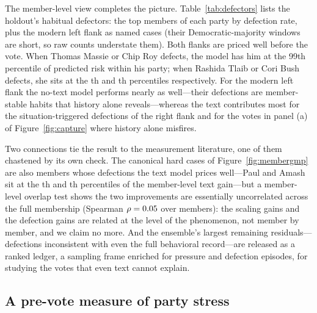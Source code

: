 \documentclass[12pt]{article}
\begin{document}
The member-level view completes the picture.
Table~\ref{tab:defectors} lists the holdout's habitual defectors: the
top members of each party by defection rate, plus the modern left
flank as named cases (their Democratic-majority windows are short, so
raw counts understate them). Both flanks are priced well before the
vote. When Thomas Massie or Chip Roy defects, the model has him at
the 99th percentile of predicted risk within his party; when Rashida
Tlaib or Cori Bush defects, she sits at the \tlaibPctChamp th and
\bushPctChamp th percentiles respectively. For the modern left flank
the no-text model performs nearly as well---their defections are
member-stable habits that history alone reveals---whereas the text
contributes most for the situation-triggered defections of the
right flank and for the votes in panel (a) of
Figure~\ref{fig:capture} where history alone misfires.

\begin{table}[!tbp]
\centering
\caption{The holdout's habitual majority defectors. ``Rate'' is
defections per majority-yea passage-family vote in the member's
holdout windows. The risk percentile is the member's mean percentile
of predicted defection probability within their party, computed
before each vote, on the votes where they in fact defected (100 =
ranked the likeliest defector in the party every time).}
\label{tab:defectors}
{\small }
\end{table}

Two connections tie the result to the measurement literature, one of
them chastened by its own check. The canonical hard cases of
Figure~\ref{fig:membergmp} are also members whose defections the
text model prices well---Paul and Amash sit at the
\paulDefGainPct th and \amashDefGainPct th percentiles of the
member-level text gain---but a member-level
overlap test shows the two improvements are essentially uncorrelated
across the full membership (Spearman $\rho = 0.05$ over
\overlapN{} members): the scaling gains and the defection gains are
related at the level of the phenomenon, not member by member, and we
claim no more. And the ensemble's largest remaining
residuals---defections
inconsistent with even the full behavioral record---are released as a
ranked ledger, a sampling frame enriched for pressure and defection
episodes, for studying the votes that even text cannot explain.

\subsection{A pre-vote measure of party stress}
\end{document}
